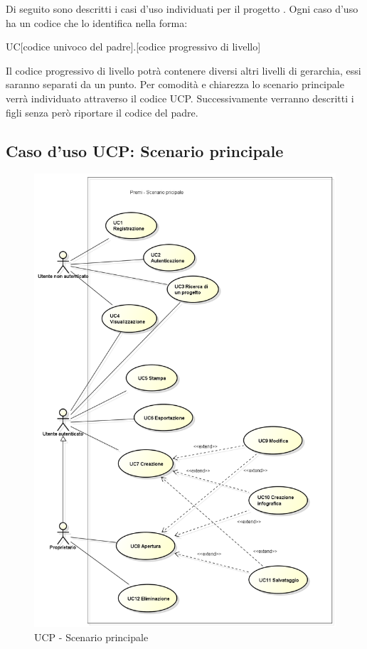 Di seguito sono descritti i casi d'uso individuati per il progetto \PROGETTO. Ogni caso d'uso ha un codice che lo identifica nella forma:
\begin{center}
	UC[codice univoco del padre].[codice progressivo di livello]
\end{center}
Il codice progressivo di livello potrà contenere diversi altri livelli di gerarchia, essi saranno separati da un punto. Per comodità e chiarezza lo scenario principale verrà individuato attraverso il codice UCP. Successivamente verranno descritti i figli senza però riportare il codice del padre.

\subsection{Caso d'uso UCP: Scenario principale}
\begin{figure}[h] 
	\centering 
    \includegraphics[scale=0.3] {img/UCP.png} 
	\caption{UCP - Scenario principale} 
\end{figure}

